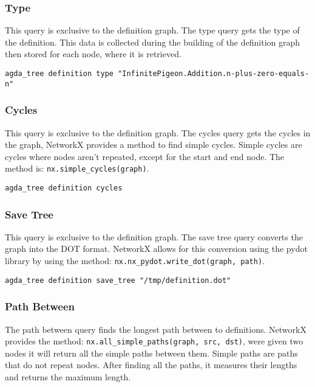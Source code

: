 \subsubsection{Type}

This query is exclusive to the definition graph. The type query gets
the type of the definition. This data is collected during the building of the
definition graph then stored for each node, where it is retrieved.

\begin{lstlisting}
agda_tree definition type "InfinitePigeon.Addition.n-plus-zero-equals-n"
\end{lstlisting}

\subsubsection{Cycles}

This query is exclusive to the definition graph. The cycles query gets the
cycles in the graph, NetworkX provides a method to find simple cycles. Simple
cycles are cycles where nodes aren't repeated, except for the start and end
node. The method is: \texttt{nx.simple\_cycles(graph)}.

\begin{lstlisting}
agda_tree definition cycles
\end{lstlisting}

\subsubsection{Save Tree}

This query is exclusive to the definition graph. The save tree query converts
the graph into the DOT format. NetworkX allows for this conversion using the
pydot library by using the method: \texttt{nx.nx\_pydot.write\_dot(graph, path)}.

\begin{lstlisting}
agda_tree definition save_tree "/tmp/definition.dot"
\end{lstlisting}

\subsubsection{Path Between}

The path between query finds the longest path between to definitions. NetworkX
provides the method: \texttt{nx.all\_simple\_paths(graph, src, dst)}, were given
two nodes it will return all the simple paths between them. Simple paths are
paths that do not repeat nodes. After finding all the paths, it measures their
lengths and returns the maximum length.

